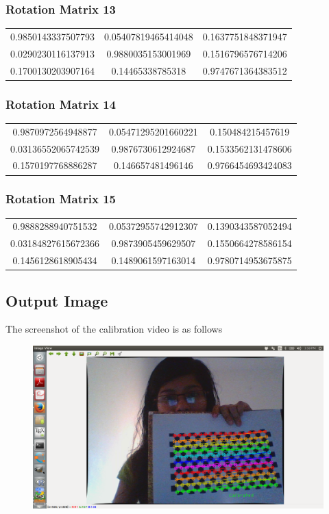 \documentclass[12pt]{article}
\begin{document}
\subsubsection{Rotation Matrix 13}
\begin{tabular}{|c|c|c|}
\hline

  
 0.9850143337507793 &  0.05407819465414048 &  0.1637751848371947 \\ 
  0.0290230116137913 &  0.9880035153001969 &  0.1516796576714206 \\ 
  0.1700130203907164 &  0.14465338785318 &  0.9747671364383512
\\ 
\hline
\end{tabular}
\subsubsection{Rotation Matrix 14}
\begin{tabular}{|c|c|c|}
\hline

  
 0.9870972564948877 &  0.05471295201660221 &  0.150484215457619 \\ 
  0.03136552065742539 &  0.9876730612924687 &  0.1533562131478606 \\ 
  0.1570197768886287 &  0.146657481496146 &  0.9766454693424083
\\ 
\hline
\end{tabular}
\subsubsection{Rotation Matrix 15}
\begin{tabular}{|c|c|c|}
\hline

  
 0.9888288940751532 &  0.05372955742912307 &  0.1390343587052494 \\ 
  0.03184827615672366 &  0.9873905459629507 &  0.1550664278586154 \\ 
  0.1456128618905434 &  0.1489061597163014 &  0.9780714953675875
\\ 
\hline
\end{tabular}

\subsection{Output Image}
The screenshot of the calibration video is as follows
\begin{figure}[htp]
\centering
\includegraphics[width=1\textwidth]{outputZhang.png}\hfill
\end{figure}
\clearpage
\end{document}
